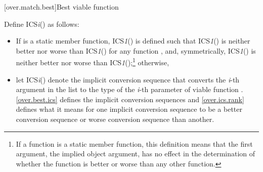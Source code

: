 [over.match.best]{Best viable function}%

\pnum
{}%
Define ICS\textit{i}() as follows:
\begin{itemize}
\item
If
is a static member function, ICS\textit{1}() is defined such that
ICS\textit{1}() is neither better nor worse than ICS\textit{1}()
for any function
,
and, symmetrically, ICS\textit{1}() is neither better nor worse than
ICS\textit{1}();\footnote{If a function is a static member function, this
definition means that the first argument, the implied object argument,
has no effect in the determination of whether the function is better
or worse than any other function.}
otherwise,
\item
let ICS\textit{i}() denote the implicit conversion sequence that converts
the \textit{i}-th argument in the list to the type of the
\textit{i}-th
parameter
of viable function
.
\ref{over.best.ics} defines the implicit conversion sequences and \ref{over.ics.rank}
defines what it means for one implicit conversion sequence to be
a better conversion sequence or worse conversion sequence than
another.
\end{itemize}


